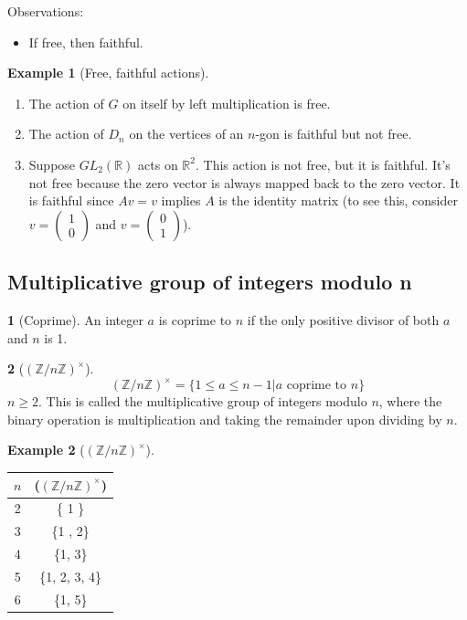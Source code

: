\documentclass[12pt]{article}
\theoremstyle{definition}
\newtheorem{definition}{\color{NavyBlue}{\textbf{Definition}}}
\newcommand{\R}{\mathbb{R}}
\newtheorem{example}{\color{WildStrawberry}Example}
\theoremstyle{definition}
\begin{document}
Observations:
\begin{itemize}
	\item If free, then faithful.
\end{itemize}

\begin{example}[Free, faithful actions]
\begin{enumerate}
	\item The action of $G$ on itself by left multiplication is free. 
	\item The action of $D_n$ on the vertices of an $n$-gon is faithful but not free.
	\item Suppose $GL_2 (\R)$ acts on $\R^2$. This action is not free, but it is faithful. It's not free because 
	the zero vector is always mapped back to the zero vector. It is faithful since $Av = v$ implies $A$ is the identity matrix (to see this, consider $v = \begin{pmatrix} 1 \\ 0\end{pmatrix}$ and $v = \begin{pmatrix} 0 \\ 1\end{pmatrix}$).
\end{enumerate}
\end{example}

\subsection{Multiplicative group of integers modulo n}

\begin{definition}[Coprime]
	An integer $a$ is coprime to $n$ if the only positive divisor of both $a$ and $n$ is 1.
\end{definition}

\begin{definition}[$(\mathbb{Z}/n \mathbb{Z})^{\times}$]
\begin{equation}
	(\mathbb{Z}/n \mathbb{Z})^{\times} = \{1 \leq a \leq n - 1 | a \text{ coprime to } n\}
\end{equation}
$n \geq 2$. This is called the multiplicative group of integers modulo $n$, where the binary operation is multiplication and taking the remainder upon dividing by $n$. 
\end{definition}

\begin{example}[$(\mathbb{Z}/n \mathbb{Z})^{\times}$]

\begin{center}
\begin{tabular}{c|c}
$n$ & ($(\mathbb{Z}/n \mathbb{Z})^{\times}$) \\
\hline 
2 & \{ 1 \} \\
3 & \{1 , 2\} \\
4 & \{1, 3\} \\
5 & \{1, 2, 3, 4\} \\
6 & \{1, 5\}
\end{tabular}
\end{center}
\end{example}
\end{document}
